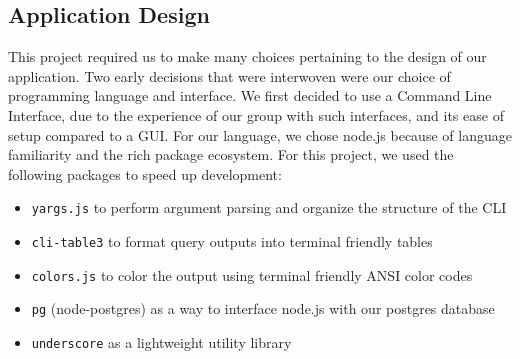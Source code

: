 \documentclass{math}
\begin{document}
\subsection*{Application Design}
This project required us to make many choices pertaining to the design of
our application. Two early decisions that were interwoven were our choice of
programming language and interface. We first decided to use a Command Line
Interface, due to the experience of our group with such interfaces, and its ease
of setup compared to a GUI. For our language, we chose node.js because of
language familiarity and the rich package ecosystem. For this project, we used
the following packages to speed up development:
\begin{itemize}
  \item \texttt{yargs.js} to perform argument parsing and organize the
    structure of the CLI
  \item \texttt{cli-table3} to format query outputs into terminal friendly
    tables
  \item \texttt{colors.js} to color the output using terminal friendly ANSI
    color codes
  \item \texttt{pg} (node-postgres) as a way to interface node.js with our
    postgres database
  \item \texttt{underscore} as a lightweight utility library
\end{itemize}
\end{document}
